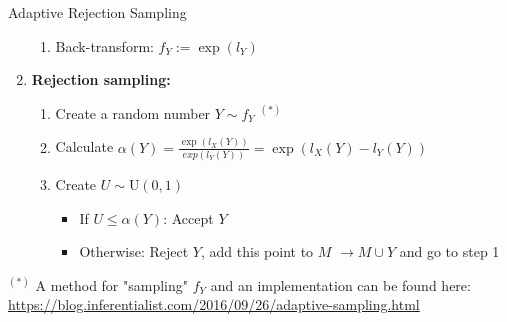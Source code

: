\documentclass[11pt,compress,t,notes=noshow, xcolor=table]{beamer}
\begin{document}
\begin{vbframe}{Adaptive Rejection Sampling}
\begin{enumerate}
\begin{enumerate}
\item Back-transform: $f_Y := \exp(l_Y)$

\framebreak


\end{enumerate}
\item \textbf{Rejection sampling:}
\begin{enumerate}
\item Create a random number $Y \sim f_Y$ $^{(*)}$
\item Calculate $ \alpha(Y) = \frac{\exp(l_X(Y))}{exp(l_Y(Y))} = \exp(l_X(Y) - l_Y(Y) )$
\item Create $U \sim \text{U}(0, 1)$
\begin{itemize}
\item If $U \le \alpha(Y)$: Accept $Y$
\item Otherwise: Reject $Y$, add this point to $M$ $\to M \cup Y$ and go to step 1
\end{itemize}

\end{enumerate}
\end{enumerate}

\vfill

\begin{footnotesize}
$^{(*)}$ A method for "sampling" $f_Y$ and an implementation can be found here: \\
\url{https://blog.inferentialist.com/2016/09/26/adaptive-sampling.html}
\end{footnotesize}

%
%


%
\end{vbframe}
\end{document}
